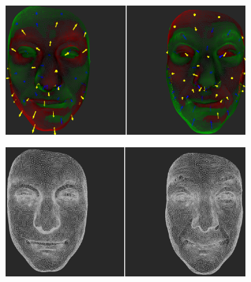 \begin{figure}[h]
\centering
\begin{subfigure}{0.49\textwidth}
\includegraphics[width=\textwidth]{./img-study/pair21.PNG}
\caption{}
\label{fig:study-9-21}
\end{subfigure}
\begin{subfigure}{0.49\textwidth}
\includegraphics[width=\textwidth]{./img-study/pair19.PNG}
\caption{}
\label{fig:study-9-19}
\end{subfigure}


\end{figure}
